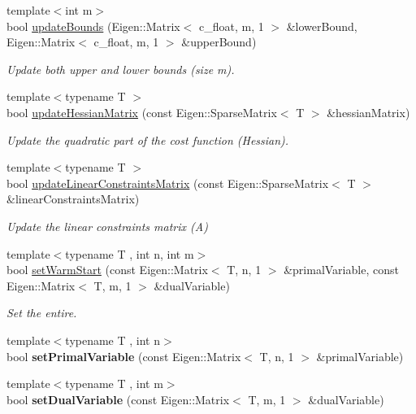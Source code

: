 \begin{DoxyCompactItemize}
{\footnotesize template$<$int m$>$ }\\bool \hyperlink{classOsqpEigen_1_1Solver_a1af39f37500a6bad6896e8e6699880fa}{update\+Bounds} (Eigen\+::\+Matrix$<$ c\+\_\+float, m, 1 $>$ \&lower\+Bound, Eigen\+::\+Matrix$<$ c\+\_\+float, m, 1 $>$ \&upper\+Bound)
\begin{DoxyCompactList}\small\item\em Update both upper and lower bounds (size m). \end{DoxyCompactList}\item 
{\footnotesize template$<$typename T $>$ }\\bool \hyperlink{classOsqpEigen_1_1Solver_a3380601ced1a2db8b226f7a32e5dd6b3}{update\+Hessian\+Matrix} (const Eigen\+::\+Sparse\+Matrix$<$ T $>$ \&hessian\+Matrix)
\begin{DoxyCompactList}\small\item\em Update the quadratic part of the cost function (Hessian). \end{DoxyCompactList}\item 
{\footnotesize template$<$typename T $>$ }\\bool \hyperlink{classOsqpEigen_1_1Solver_a4eb3a0b2bec16b00dfc8334d4ff9ab8d}{update\+Linear\+Constraints\+Matrix} (const Eigen\+::\+Sparse\+Matrix$<$ T $>$ \&linear\+Constraints\+Matrix)
\begin{DoxyCompactList}\small\item\em Update the linear constraints matrix (A) \end{DoxyCompactList}\item 
{\footnotesize template$<$typename T , int n, int m$>$ }\\bool \hyperlink{classOsqpEigen_1_1Solver_a13f8e53aae03e483fa46066c7b93e066}{set\+Warm\+Start} (const Eigen\+::\+Matrix$<$ T, n, 1 $>$ \&primal\+Variable, const Eigen\+::\+Matrix$<$ T, m, 1 $>$ \&dual\+Variable)
\begin{DoxyCompactList}\small\item\em Set the entire. \end{DoxyCompactList}\item 
{\footnotesize template$<$typename T , int n$>$ }\\bool {\bfseries set\+Primal\+Variable} (const Eigen\+::\+Matrix$<$ T, n, 1 $>$ \&primal\+Variable)\label{classOsqpEigen_1_1Solver_a6665f91ac8c073b753cba4af1aad606e}

\item 
{\footnotesize template$<$typename T , int m$>$ }\\bool {\bfseries set\+Dual\+Variable} (const Eigen\+::\+Matrix$<$ T, m, 1 $>$ \&dual\+Variable)\label{classOsqpEigen_1_1Solver_a18059c9138e3ce633ea71ea7a7b3d1e2}


\end{DoxyCompactItemize}
